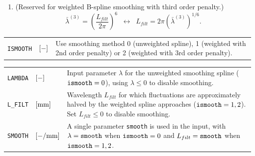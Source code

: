 \documentclass[12pt]{report}
\newenvironment{inputvars}{\vspace{0.4\baselineskip}%

\begin{tabular}{>{\raggedright}p{22mm}p{19mm}p{113mm}}}{
\end{tabular}

}
\newcommand{\inpvar}[3]{{\small\tt #1} & $#2$ & #3 \\[1ex]}
\newcommand{\inpbreak}{\end{inputvars}\begin{inputvars}}
\begin{document}
\begin{enumerate}
        The value of $\bar{\lambda}^{(2)}$ is computed from the input
        $L_{filt}$ as 
\begin{equation}
        \bar{\lambda}^{(2)}=\left(\frac{L_{filt}}{2\pi}\right)^4 
                \;\;\leftrightarrow\;\;
                L_{filt} = 2\pi \left(\bar{\lambda}^{(2)}\right)^{1/4} .
\end{equation}
        By this approach, the spline
        acts like a low pass filter, diminishing fluctuations with
        wavelengths $L<L_{filt}$ and keeping fluctuations in the output
        with $L>L_{filt}$ \cite{Vollebregt2022b-cm2022}.
\item (Reserved for weighted B-spline smoothing with third order penalty.)
\begin{equation}
        \bar{\lambda}^{(3)}= \left(\frac{L_{filt}}{2\pi}\right)^6 
                \;\;\leftrightarrow\;\;
                L_{filt} = 2\pi \left(\bar{\lambda}^{(3)}\right)^{1/6} .
\end{equation}

\end{enumerate}
\begin{inputvars}
\inpvar{ISMOOTH}{\bunit{-}}{Use smoothing method 0 (unweighted spline), 1
        (weighted with 2nd order penalty) or 2 (weighted with 3rd order
        penalty).}
\inpbreak
\inpvar{LAMBDA}{\bunit{-}}{Input parameter $\lambda$ for the unweighted
        smoothing spline (${\tt ismooth}=0$), using $\lambda\le 0$ to
        disable smoothing.}
\inpvar{L\_FILT}{\bunit{mm}}{Wavelength $L_{filt}$ for which fluctuations
        are approximately halved by the weighted spline approaches
        (${\tt ismooth}=1, 2$). Set $L_{filt}\le 0$ to disable smoothing.}
\inpvar{SMOOTH}{\bunit{-/mm}}{A single parameter {\tt smooth} is used in
        the input, with $\lambda={\tt smooth}$ when ${\tt ismooth}=0$ and
        $L_{filt}={\tt smooth}$ when ${\tt ismooth}=1, 2$.}
\end{inputvars}
\end{document}
